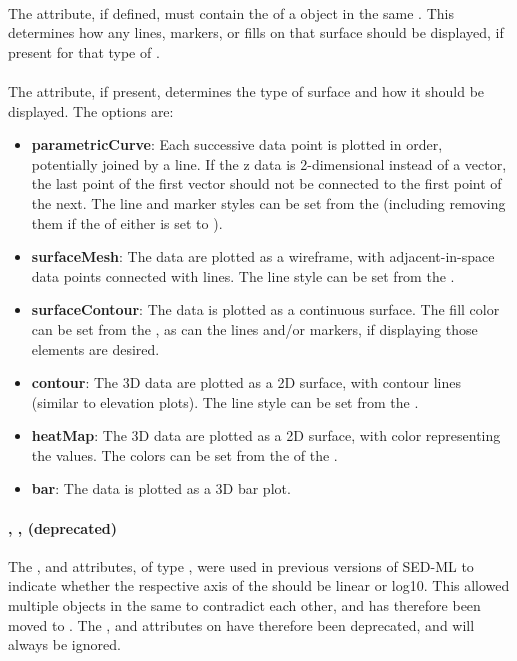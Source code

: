 \begin{blockChanged}
\paragraph*{}
The  attribute, if defined, must contain the  of a \Style object in the same \SedDocument.  This \Style determines how any lines, markers, or fills on that surface should be displayed, if present for that type of \Surface.

\paragraph*{}
The  attribute, if present, determines the type of surface and how it should be displayed.  The options are:

\begin{itemize}
\item \textbf{parametricCurve}: Each successive data point is plotted in order, potentially joined by a line.  If the z data is 2-dimensional instead of a vector, the last point of the first vector should not be connected to the first point of the next.  The line and marker styles can be set from the  (including removing them if the  of either is set to ).
\item \textbf{surfaceMesh}: The data are plotted as a wireframe, with adjacent-in-space data points connected with lines.  The line style can be set from the .
\item \textbf{surfaceContour}: The data is plotted as a continuous surface.  The fill color can be set from the , as can the lines and/or markers, if displaying those elements are desired.
\item \textbf{contour}:  The 3D data are plotted as a 2D surface, with contour lines (similar to elevation plots).  The line style can be set from the .
\item \textbf{heatMap}:  The 3D data are plotted as a 2D surface, with color representing the values.  The colors can be set from the  of the .
\item \textbf{bar}: The data is plotted as a 3D bar plot.
\end{itemize}

\paragraph*{, ,  (deprecated)}
The ,  and  attributes, of type , were used in previous versions of SED-ML to indicate whether the respective axis of the \Plot should be linear or log10.  This allowed multiple objects in the same \Plot to contradict each other, and has therefore been moved to \Axis.  The ,  and  attributes on \Surface have therefore been deprecated, and will always be ignored.

\end{blockChanged}
